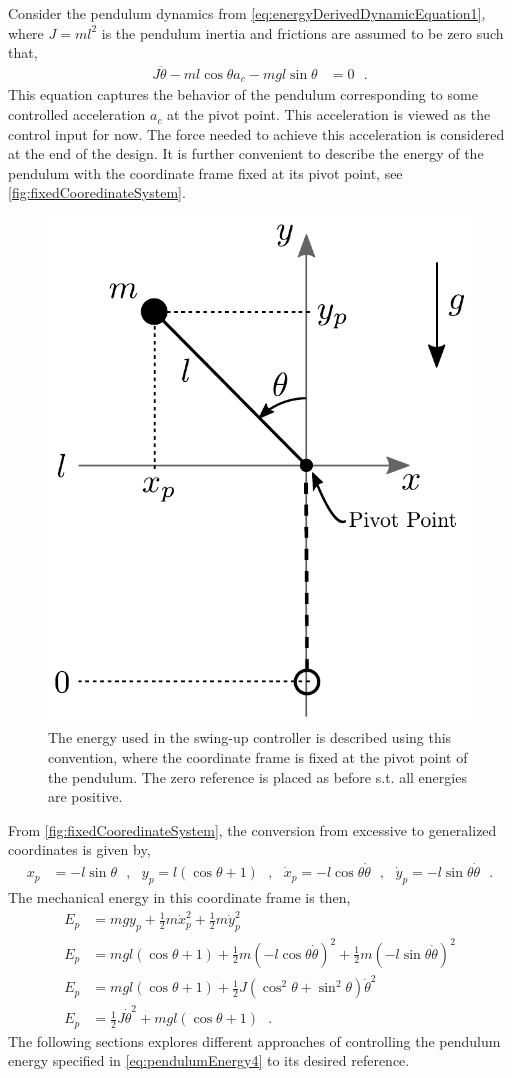 Consider the pendulum dynamics from \autoref{eq:energyDerivedDynamicEquation1}, where $J = m l^2$ is the pendulum inertia and frictions are assumed to be zero such that,
\begin{align}
  J \ddot{\theta} - m l \cos \theta a_c - m g l \sin \theta  &= 0 \ \ \ .  \label{eq:pendulumDynamics}
\end{align}
This equation captures the behavior of the pendulum corresponding to some controlled acceleration $a_c$ at the pivot point. This acceleration is viewed as the control input for now. The force needed to achieve this acceleration is considered at the end of the design. It is further convenient to describe the energy of the pendulum with the coordinate frame fixed at its pivot point, see \autoref{fig:fixedCooredinateSystem}.
%
\begin{figure}[H]
  \includegraphics[width=.3\textwidth]{figures/fixedCooredinateSystem}
  \caption{The energy used in the swing-up controller is described using this convention, where the coordinate frame is fixed at the pivot point of the pendulum. The zero reference is placed as before s.t. all energies are positive.}
  \label{fig:fixedCooredinateSystem}
\end{figure}
%
From \autoref{fig:fixedCooredinateSystem}, the conversion from excessive to generalized coordinates is given by,
\begin{align}
  x_p  &= -l \sin \theta   \ \ \ ,\ \ \ y_p = l(\cos \theta + 1)  \ \ \ ,\ \ \ \dot{x}_p = -l \cos \theta \dot{\theta}  \ \ \ ,\ \ \ \dot{y}_p = -l \sin \theta \dot{\theta}  \ \ \ .  \label{eq:cooredinateConvertFixed}
\end{align}
The mechanical energy in this coordinate frame is then,
\begin{align}
  E_p &= m g y_p + \tfrac{1}{2} m \dot{x}_p^2 + \tfrac{1}{2} m \dot{y}_p^2   \label{eq:pendulumEnergy1} \\
  E_p &= m g l (\cos \theta +1) + \tfrac{1}{2} m (-l \cos \theta \dot{\theta})^2 + \tfrac{1}{2} m (-l \sin \theta \dot{\theta})^2  \label{eq:pendulumEnergy2} \\
  E_p &= m g l (\cos \theta +1) + \tfrac{1}{2} J (\cos^2 \theta  + \sin^2 \theta )\dot{\theta}^2   \label{eq:pendulumEnergy3} \\
  E_p &= \tfrac{1}{2} J \dot{\theta}^2 + m g l (\cos \theta +1) \ \ \ .   \label{eq:pendulumEnergy4}
\end{align}
The following sections explores different approaches of controlling the pendulum energy specified in \autoref{eq:pendulumEnergy4} to its desired reference.

